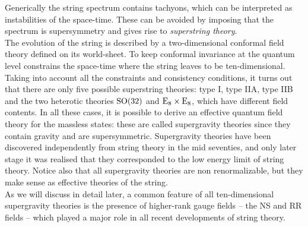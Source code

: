 \documentclass[draft]{phd}
\begin{document}
Generically the string spectrum contains 
tachyons, which can be interpreted as instabilities of the space-time.
These can be avoided by imposing that the spectrum is supersymmetry and gives rise to \emph{superstring theory}. \\
The evolution of the string is described by a two-dimensional conformal field theory defined on its world-sheet. 
To keep conformal invariance at the quantum level 
constrains the space-time where the string leaves to be ten-dimensional. \\
Taking into account all the constraints and consistency conditions, it turns out that there are only five possible superstring theories: type I, type IIA, type IIB and the two heterotic theories $\mathrm{SO}(32)$ and $\mathrm{E}_8 \times \mathrm{E}_8$, which have different field contents. 
In all these cases, it is possible to derive an effective quantum field theory for the massless states: these are called supergravity theories since they contain gravity and are
supersymmetric. Supergravity theories have been discovered independently from string theory in the mid seventies, 
and only later stage it was realised that they corresponded to the low energy limit of string theory.
Notice also that all supergravity theories are non renormalizable, but they make sense as effective theories of the string. \\
As we will discuss in detail later, a common feature of all ten-dimensional supergravity theories is the presence of higher-rank gauge fields -- the NS and RR fields -- 
which played a major role in all recent developments of string theory.
\end{document}
